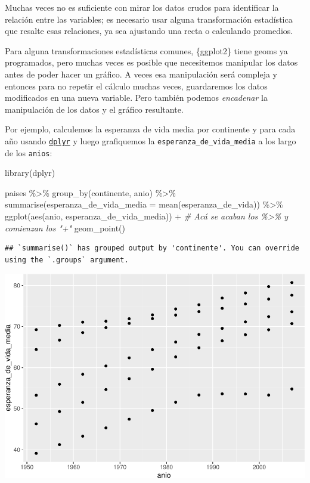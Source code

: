 \documentclass[
  openany]{book}
\newenvironment{Shaded}{\begin{snugshade}}{\end{snugshade}}
\newcommand{\AttributeTok}[1]{\textcolor[rgb]{0.77,0.63,0.00}{#1}}
\newcommand{\CommentTok}[1]{\textcolor[rgb]{0.56,0.35,0.01}{\textit{#1}}}
\newcommand{\FunctionTok}[1]{\textcolor[rgb]{0.00,0.00,0.00}{#1}}
\newcommand{\NormalTok}[1]{#1}
\newcommand{\SpecialCharTok}[1]{\textcolor[rgb]{0.00,0.00,0.00}{#1}}
\begin{document}
Muchas veces no es suficiente con mirar los datos crudos para identificar la relación entre las variables; es necesario usar alguna transformación estadística que resalte esas relaciones, ya sea ajustando una recta o calculando promedios.

Para alguna transformaciones estadísticas comunes, \{ggplot2\} tiene geoms ya programados, pero muchas veces es posible que necesitemos manipular los datos antes de poder hacer un gráfico.
A veces esa manipulación será compleja y entonces para no repetir el cálculo muchas veces, guardaremos los datos modificados en una nueva variable.
Pero también podemos \emph{encadenar} la manipulación de los datos y el gráfico resultante.

Por ejemplo, calculemos la esperanza de vida media por continente y para cada año usando \href{05-dplyr-I.html}{\texttt{dplyr}} y luego grafiquemos la \texttt{esperanza\_de\_vida\_media} a los largo de los \texttt{anios}:

\begin{Shaded}
\begin{Highlighting}[]
\FunctionTok{library}\NormalTok{(dplyr)}

\NormalTok{paises }\SpecialCharTok{\%\textgreater{}\%} 
  \FunctionTok{group\_by}\NormalTok{(continente, anio) }\SpecialCharTok{\%\textgreater{}\%} 
  \FunctionTok{summarise}\NormalTok{(}\AttributeTok{esperanza\_de\_vida\_media =} \FunctionTok{mean}\NormalTok{(esperanza\_de\_vida)) }\SpecialCharTok{\%\textgreater{}\%} 
  \FunctionTok{ggplot}\NormalTok{(}\FunctionTok{aes}\NormalTok{(anio, esperanza\_de\_vida\_media)) }\SpecialCharTok{+}  \CommentTok{\# Acá se acaban los \%\textgreater{}\% y comienzan los "+"}
  \FunctionTok{geom\_point}\NormalTok{()}
\end{Highlighting}
\end{Shaded}

\begin{verbatim}
## `summarise()` has grouped output by 'continente'. You can override using the `.groups` argument.
\end{verbatim}

\begin{center}\includegraphics[width=1\linewidth]{DT6_files/figure-latex/unnamed-chunk-54-1} \end{center}
\end{document}
